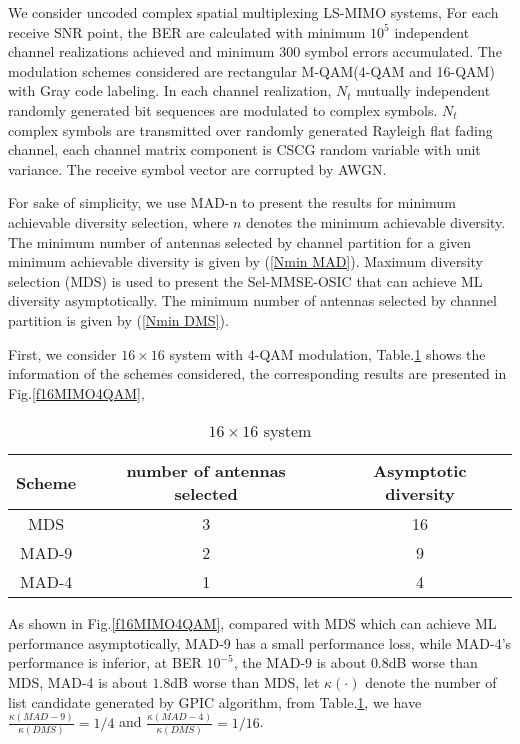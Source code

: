 \documentclass[12pt, draftclsnofoot, onecolumn]{IEEEtran}
\begin{document}
We consider uncoded complex spatial multiplexing LS-MIMO systems, For each receive SNR point, the BER are calculated with minimum $10^{5}$ independent channel realizations achieved and minimum 300 symbol errors accumulated. The modulation schemes considered are rectangular M-QAM(4-QAM and 16-QAM) with Gray code labeling. In each channel realization, $N_{t}$ mutually independent randomly generated bit sequences are modulated to complex symbols. $N_{t}$ complex symbols are transmitted over randomly generated Rayleigh flat fading channel, each channel matrix component is CSCG random variable with unit variance. The receive symbol vector are corrupted by AWGN.

For sake of simplicity, we use MAD-n to present the results for minimum achievable diversity selection, where $n$ denotes the minimum achievable diversity. The minimum number of antennas selected by channel partition for a given minimum achievable diversity is given by (\ref{Nmin MAD}). Maximum diversity selection (MDS) is used to present the Sel-MMSE-OSIC that can achieve ML diversity asymptotically. The minimum number of antennas selected by channel partition is given by (\ref{Nmin DMS}).

First, we consider $16\times 16$ system with $4$-QAM modulation, Table.\ref{t16MIMO4QAM} shows the information of the schemes considered, the corresponding results are presented in Fig.\ref{f16MIMO4QAM}, 
\begin{table}[htb]
\renewcommand{\arraystretch}{1.3}
\caption{$16\times 16$ system}
\label{t16MIMO4QAM}
\centering
\begin{tabular}{|c|c|c|}
\hline
Scheme&number of antennas selected&Asymptotic diversity\\
\hline 
MDS&3&16\\
\hline
MAD-9&2&9\\
\hline
MAD-4&1&4\\
\hline
\end{tabular}
\end{table}

As shown in Fig.\ref{f16MIMO4QAM}, compared with MDS which can achieve ML performance asymptotically, MAD-9 has a small performance loss, while MAD-4's performance is inferior, at BER $10^{-5}$, the MAD-9 is about $0.8$dB worse than MDS, MAD-4 is about $1.8$dB worse than MDS, let $\kappa(\cdot)$ denote the number of list candidate generated by GPIC algorithm\cite{radji2009interference}, from Table.\ref{t16MIMO4QAM}, 
we have $\frac{\kappa(MAD-9)}{\kappa(DMS)}=1/4$ and $\frac{\kappa(MAD-4)}{\kappa(DMS)}=1/16$.
\end{document}

